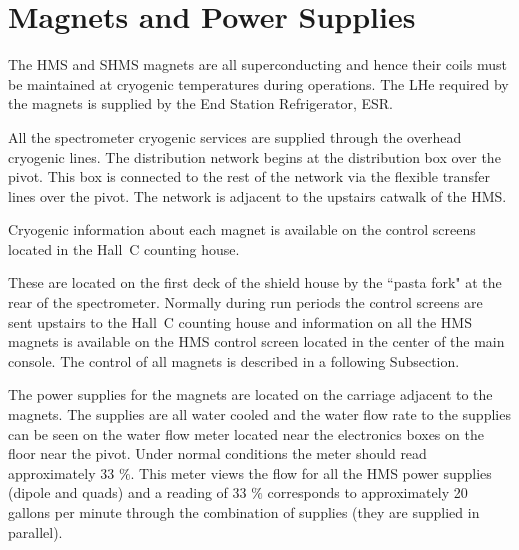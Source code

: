 {%
%
%
%
%
%
%
%
%
%





\section{Magnets and Power Supplies}

The HMS and SHMS magnets are all
superconducting and hence their coils must be maintained at
cryogenic temperatures during operations. The LHe required by the magnets
is supplied by the End Station Refrigerator, ESR.

All the spectrometer cryogenic services are supplied through the overhead
cryogenic lines. The distribution network begins at the distribution
box over the pivot. This box is connected to the rest of the network via the
flexible transfer lines over the pivot. The network is adjacent to
the upstairs catwalk of the HMS.

Cryogenic information about each magnet is available on the control
screens located in the Hall~C counting house.
\begin{obsolete}
These are located on the first deck
of the shield house by the ``pasta fork" at the rear of the spectrometer.
Normally during run periods the control screens are sent upstairs to the
Hall~C counting house and information on all the HMS magnets is available
on the HMS control screen located in the center of the main console.
The control of all magnets is described in a following Subsection.
\end{obsolete}

The power supplies for the magnets are located on the carriage
adjacent to the magnets. The supplies are all water cooled and
the water flow rate to the supplies can be seen on the water flow
meter located near the electronics boxes on the floor near the pivot.
Under normal conditions the meter should read
approximately 33 $\%$. This meter views the flow for all the HMS power supplies
(dipole and quads) and a reading of 33 $\%$ corresponds to approximately
20 gallons per minute through the combination of supplies (they are supplied
in parallel).

}
